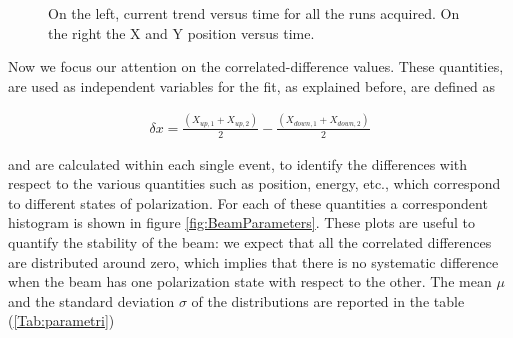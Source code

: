 \begin{figure}[hbtp]
\centering
{}
\caption{On the left, current trend versus time for all the runs acquired. On the right the X and Y position versus time.}\label{fig::PositionTrend}
\end{figure}

Now we focus our attention on the correlated-difference values. These quantities, are used as independent variables for the fit, as explained before, are defined as 

\begin{align*}
\delta x =  \frac{(X_{up,1} + X_{up,2})}{2} - \frac{(X_{down,1} + X_{down,2})}{2}
\end{align*}

and are calculated within each single event, to identify the differences with respect to the various quantities such as position, energy, etc., which correspond to different states of polarization. For each of these quantities a correspondent histogram is shown in figure \ref{fig:BeamParameters}. These plots are useful to quantify the stability of the beam: we expect that all the correlated differences are distributed around zero, which implies that there is no systematic difference when the beam has one polarization state with respect to the other. The mean $\mu$ and the standard deviation $\sigma$ of the distributions are reported in the table (\ref{Tab:parametri}) 


